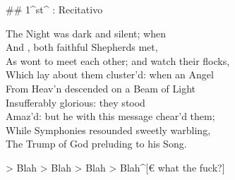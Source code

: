 ## 1^st^ \mvmt: Recitativo

\begin{linenumbers}
The Night was dark and silent; when  \\
And , both faithful Shepherds met,  \\
As wont to meet each other; and watch their flocks,  \\
Which lay about them cluster’d: when an Angel  \\
From Heav’n descended on a Beam of Light  \\
Insufferably glorious: they stood  \\
Amaz’d: but he with this message chear’d them;  \\
While Symphonies resounded sweetly warbling,  \\
The Trump of God preluding to his Song.
\end{linenumbers}

> Blah
> Blah
> Blah
> Blah^[€ what the fuck?]
